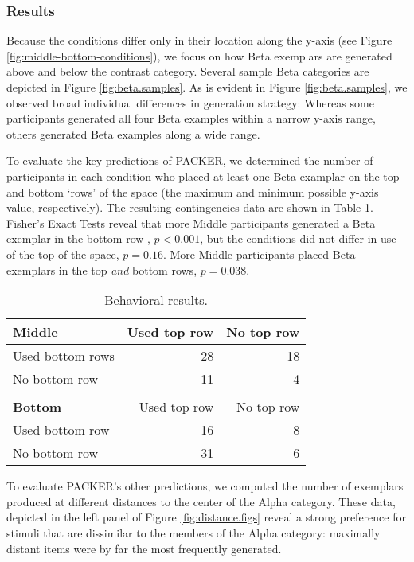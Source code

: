 \documentclass[10pt,letterpaper]{article}
\begin{document}
\subsubsection{Results}

Because the conditions differ only in their location along the y-axis (see Figure \ref{fig:middle-bottom-conditions}), we focus on how Beta exemplars are generated above and below the contrast category. Several sample Beta categories are depicted in Figure \ref{fig:beta.samples}. As is evident in Figure \ref{fig:beta.samples}, we observed broad individual differences in generation strategy: Whereas some participants generated all four Beta examples within a narrow y-axis range, others generated Beta examples along a wide range. 

To evaluate the key predictions of PACKER, we determined the number of participants in each condition who placed at least one Beta examplar on the top and bottom `rows' of the space (the maximum and minimum possible y-axis value, respectively). The resulting contingencies data are shown in Table \ref{table:subset-table}. Fisher's Exact Tests reveal that more Middle participants generated a Beta exemplar in the bottom row , $p < 0.001$, but the conditions did not differ in use of the top of the space, $p = 0.16$. More Middle participants placed Beta exemplars in the top \textit{and} bottom rows, $p = 0.038$. 

\begin{table}
\begin{center} 
\caption{Behavioral results.} 
\label{table:subset-table} 
\vskip 0.12in
\begin{tabular}{ l r r}
    \textbf{Middle}         & Used top row & No top row \\
    \hline
    Used bottom rows       &  28 & 18  \\
    No bottom row          &  11 &  4  \\
    \\
    \textbf{Bottom}         & Used top row & No top row \\
    \hline
    Used bottom row        & 16 & 8 \\
    No bottom row          & 31 & 6 \\
\end{tabular}
\end{center} 
\end{table}

To evaluate PACKER's other predictions, we computed the number of exemplars produced at different distances to the center of the Alpha category. These data, depicted in the left panel of Figure \ref{fig:distance.figs} reveal a strong preference for stimuli that are dissimilar to the members of the Alpha category: maximally distant items were by far the most frequently generated. 
\end{document}
